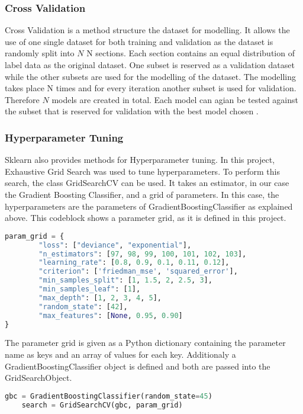 \subsubsection{Cross Validation}

Cross Validation is a method structure the dataset for modelling. It allows the use of 
one single dataset for both training and validation as the dataset is randomly split into \(N\) N sections. Each 
section contains an equal distribution of label data as the original dataset. One subset is reserved as a 
validation dataset while the other subsets are used for the modelling of the dataset. The modelling takes place 
N times and for every iteration another subset is used for validation. Therefore \(N\) models are created in total. 
Each model can agian be tested against the subset that is reserved for validation with the best model chosen \cite[p.8f]{lewis2000introduction}. 

\subsubsection{Hyperparameter Tuning}

Sklearn also provides methods for Hyperparameter tuning. In this project, Exhaustive Grid Search was used to 
tune hyperparameters. To perform this search, the class GridSearchCV can be used. It takes an 
estimator, in our case the Gradient Boosting Classifier, and a grid of parameters.
In this case, the hyperparameters are the parameters of GradientBoostingClassifier as 
explained above. This codeblock shows a parameter grid, as it is defined in this project.

\begin{lstlisting}[language=Python]
    param_grid = {
        "loss": ["deviance", "exponential"],
        "n_estimators": [97, 98, 99, 100, 101, 102, 103],
        "learning_rate": [0.8, 0.9, 0.1, 0.11, 0.12],
        "criterion": ['friedman_mse', 'squared_error'],
        "min_samples_split": [1, 1.5, 2, 2.5, 3],
        "min_samples_leaf": [1],
        "max_depth": [1, 2, 3, 4, 5],
        "random_state": [42],
        "max_features": [None, 0.95, 0.90]
}
\end{lstlisting}

The parameter grid is given as a Python dictionary containing the parameter name as keys and 
an array of values for each key. Additionaly a GradientBoostingClassifier object is defined 
and both are passed into the GridSearchObject.

\begin{lstlisting}[language=Python]
    gbc = GradientBoostingClassifier(random_state=45)    
    search = GridSearchCV(gbc, param_grid)
\end{lstlisting}

